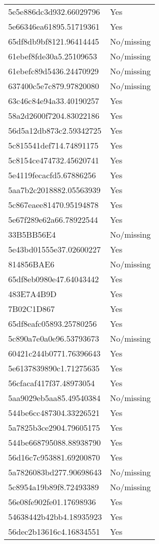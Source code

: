 \begin{tabular}{ll}
5e5e886dc3d932.66029796 & Yes \\
5e66346ea61895.51719361 & Yes \\
65df8db9bf8121.96414445 & No/missing \\
61ebef8fde30a5.25109653 & No/missing \\
61ebefc89d5436.24470929 & No/missing \\
637400c5e7c879.97820080 & No/missing \\
63c46c84e94a33.40190257 & Yes \\
58a2d2600f7204.83022186 & Yes \\
56d5a12db873c2.59342725 & Yes \\
5c815541def714.74891175 & Yes \\
5c8154ce474732.45620741 & Yes \\
5e4119fecacfd5.67886256 & Yes \\
5aa7b2c2018882.05563939 & Yes \\
5c867eaee81470.95194878 & Yes \\
5e67f289e62a66.78922544 & Yes \\
33B5BB56E4 & No/missing \\
5e43bd01555e37.02600227 & Yes \\
814856BAE6 & No/missing \\
65df8eb0980e47.64043442 & Yes \\
483E7A4B9D & Yes \\
7B02C1D867 & Yes \\
65df8eafc05893.25780256 & Yes \\
5c890a7e0a0e96.53793673 & No/missing \\
60421c244b0771.76396643 & Yes \\
5e6137839890c1.71275635 & Yes \\
56cfacaf417f37.48973054 & Yes \\
5aa9029eb5aa85.49540384 & No/missing \\
544be6cc487304.33226521 & Yes \\
5a7825b3ce2904.79605175 & Yes \\
544be668795088.88938790 & Yes \\
56d16c7c953881.69200870 & Yes \\
5a7826083bd277.90698643 & No/missing \\
5c8954a19b89f8.72493389 & No/missing \\
56e08fe902fe01.17698936 & Yes \\
54638442b42bb4.18935923 & Yes \\
56dec2b13616c4.16834551 & Yes \\

\end{tabular}

